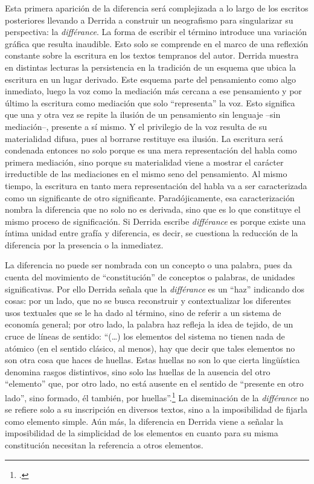\documentclass{book}
\begin{document}
Esta primera aparición de la diferencia será complejizada a lo largo de
los escritos posteriores llevando a Derrida a construir un neografismo
para singularizar su perspectiva: la \emph{différance}. La forma de
escribir el término introduce una variación gráfica que resulta
inaudible. Esto solo se comprende en el marco de una reflexión constante
sobre la escritura en los textos tempranos del autor. Derrida muestra en
distintas lecturas la persistencia en la tradición de un esquema que
ubica la escritura en un lugar derivado. Este esquema parte del
pensamiento como algo inmediato, luego la voz como la mediación más
cercana a ese pensamiento y por último la escritura como mediación que
solo \enquote{representa} la voz. Esto significa que una y otra vez se repite la
ilusión de un pensamiento sin lenguaje --sin mediación--, presente a sí
mismo. Y el privilegio de la voz resulta de su materialidad difusa, pues
al borrarse restituye esa ilusión. La escritura será condenada entonces
no solo porque es una mera representación del habla como primera
mediación, sino porque su materialidad viene a mostrar el carácter
irreductible de las mediaciones en el mismo seno del pensamiento. Al
mismo tiempo, la escritura en tanto mera representación del habla va a
ser caracterizada como un significante de otro significante.
Paradójicamente, esa caracterización nombra la diferencia que no solo no
es derivada, sino que es lo que constituye el mismo proceso de
significación. Si Derrida escribe \emph{différance} es porque existe una
íntima unidad entre grafía y diferencia, es decir, se cuestiona la
reducción de la diferencia por la presencia o la inmediatez.

La diferencia no puede ser nombrada con un concepto o una palabra, pues
da cuenta del movimiento de \enquote{constitución} de conceptos o palabras, de
unidades significativas. Por ello Derrida señala que la
\emph{différance} es un \enquote{haz} indicando dos cosas: por un lado, que no
se busca reconstruir y contextualizar los diferentes usos textuales que
se le ha dado al término, sino de referir a un sistema de economía
general; por otro lado, la palabra haz refleja la idea de tejido, de un
cruce de líneas de sentido: \enquote{(\dots) los elementos del sistema no
tienen nada de atómico (en el sentido clásico, al menos), hay que decir
que tales elementos no son otra cosa que haces de huellas. Estas huellas
no son lo que cierta lingüística denomina rasgos distintivos, sino solo
las huellas de la ausencia del otro ``elemento'' que, por otro lado, no
está ausente en el sentido de ``presente en otro lado'', sino formado,
él también, por huellas}.\footcite[95]{bennington1994} La diseminación de la
\emph{différance} no se refiere solo a su inscripción en diversos
textos, sino a la imposibilidad de fijarla como elemento simple. Aún
más, la diferencia en Derrida viene a señalar la imposibilidad de la
simplicidad de los elementos en cuanto para su misma constitución
necesitan la referencia a otros elementos.
\end{document}
